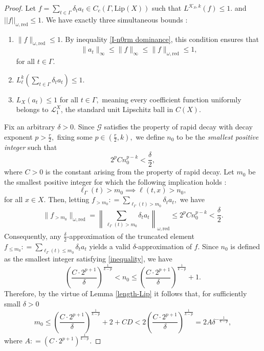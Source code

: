 \documentclass[a4paper,11pt,reqno]{amsart}
\theoremstyle{plain}
\theoremstyle{mainthmstyle}
\theoremstyle{named}
\numberwithin{equation}{section}
\begin{document}
\begin{proof}
Let $f = \sum\limits_{t \in \Gamma} \delta_t a_t \in C_c(\Gamma, \mathrm {Lip} (X))$ such that $L^{\mathcal{K}_S, k}(f) \leq 1.$ and $\lvert\lvert f\rvert\rvert_{\omega, \mathrm {red}}\leq 1$. We have exactly three simultaneous bounds $:$
\begin{enumerate}
\item $\|f\|_{\omega, \mathrm {red}} \leq 1.$ By inequality \ref{I-n0rm dominance}, this condition ensures that $$\|a_t\|_{\infty} \leq \|f\|_{\infty} \leq \|f\|_{\omega, \mathrm {red}} \leq 1,$$ for all $t \in \Gamma.$
\item $L_{\ell}^k\left (\sum\limits_{t \in \Gamma} \delta_t a_t \right ) \leq 1.$
 \item $L_X(a_t) \leq 1$ for all $t \in \Gamma,$ meaning every coefficient function uniformly belongs to $\mathcal{L}_1^X$, the standard unit Lipschitz ball in $C(X).$
\end{enumerate}
Fix an arbitrary $\delta > 0.$ Since $\mathcal G$ satisfies the property of rapid decay with decay exponent $p > \frac {r} {2},$ fixing some $p \in \left (\frac {r} {2}, k \right ),$ we define $n_0$ to be the \textit{smallest positive integer} such that
\begin{equation} \label{inequality} 2^p C n_0^{p-k} < \frac{\delta}{2}, \end{equation}
where $C > 0$ is the constant arising from the property of rapid decay. Let $m_0$ be the smallest positive integer for which the following implication holds $:$
$$\ell_{\Gamma} (t) > m_0 \implies \ell (t, x) > n_0,$$ for all $x \in X.$ Then, letting $f_{> m_0} : = \sum\limits_{\ell_{\Gamma} (t) > m_0} \delta_t a_t,$ we have
$$\|f_{> m_0}\|_{\omega,\mathrm{red}} = \left\| \sum_{\ell_{\Gamma} (t) > m_0} \delta_t a_t \right\|_{\omega, \mathrm{red}} \le 2^p C n_0^{p-k} < \frac{\delta}{2}.$$
Consequently, any $\frac{\delta}{2}$-approximation of the truncated element $f_{\leq m_0} : = \sum\limits_{\ell_{\Gamma} (t) \leq m_0} \delta_t a_t$ yields a valid $\delta$-approximation of $f.$ Since $n_0$ is defined as the smallest integer satisfying \eqref{inequality}, we have
$$\left( \frac{C \cdot 2^{p+1}}{\delta} \right)^{\frac{1}{k-p}} < n_0 \le \left( \frac{C \cdot 2^{p+1}}{\delta} \right)^{\frac{1}{k-p}} + 1.$$
Therefore, by the virtue of Lemma \ref{length-Lip} it follows that, for sufficiently small $\delta > 0$ 
\begin{equation} \label{bound for m_0} m_0 \leq \left( \frac{C \cdot 2^{p+1}}{\delta} \right)^{\frac{1}{k-p}} + 2 + CD < 2 \left( \frac{C \cdot 2^{p+1}}{\delta} \right)^{\frac{1}{k-p}} = 2 A \delta^{- \frac {1} {k - p}}, \end{equation}
where $A : = \left (C \cdot 2^{p + 1} \right )^{\frac {1} {k - p}}.$



\end{proof}
\end{document}
